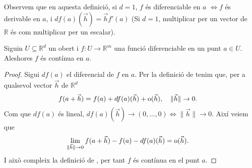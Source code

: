 \documentclass[../Apunts.tex]{subfiles}
\begin{document}
	\begin{observation}
		Observem que en aquesta definició, si \(d=1\), \(f\) és diferenciable en \(a\) \(\Longleftrightarrow f\) és derivable en \(a\), i \(df(a)(\vec{h})=\vec{h}f'(a)\) (Si \(d=1\), multiplicar per un vector de \(\mathbb{R}\) és com multiplicar per un escalar).
	\end{observation}
	\begin{proposition}\label{prop:Diferenciable implica contínua}
		Siguin \(U\subseteq\mathbb{R}^{d}\) un obert i \(f\colon U\to\mathbb{R}^{m}\) una funció diferenciable en un punt \(a\in U\). Aleshores \(f\) és contínua en \(a\).
		\begin{proof}
			Sigui \(df(a)\) el diferencial de \(f\) en \(a\). Per la definició de  tenim que, per a qualsevol vector \(\vec{h}\) de \(\mathbb{R}^d\)
			\[f(a+\vec{h})=f(a)+df(a)(\vec{h})+\operatorname{o}(\vec{h}),\quad \lVert\vec{h}\rVert\to0.\]
			Com que \(df(a)\) és lineal, \(df(a)(\vec{h})\to(0,\dots,0)\Leftrightarrow\lVert\vec{h}\rVert\to0\). Així veiem que
			\[\lim_{\lVert\vec{h}\rVert\to0}f(a+\vec{h})-f(a)-df(a)(\vec{h})=\operatorname{o}(\vec{h}).\]
			I això compleix la definició de , per tant \(f\) és contínua en el punt \(a\).
		\end{proof}
	\end{proposition}
\end{document}
